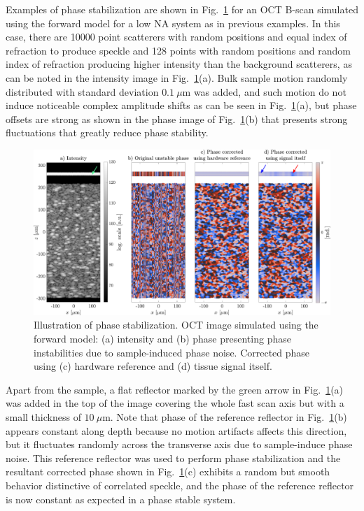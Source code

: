 Examples of phase stabilization are shown in Fig.~\ref{fig:PhaseStabilization} for an OCT B-scan simulated using the forward model for a low NA system as in previous examples. In this case, there are 10000 point scatterers with random positions and equal index of refraction to produce speckle and 128 points with random positions and random index of refraction producing higher intensity than the background scatterers, as can be noted in the intensity image in Fig.~\ref{fig:PhaseStabilization}(a). Bulk sample motion randomly distributed with standard deviation $0.1~\mu$m was added, and such motion do not induce noticeable complex amplitude shifts as can be seen in Fig.~\ref{fig:PhaseStabilization}(a), but phase offsets are strong as shown in the phase image of Fig.~\ref{fig:PhaseStabilization}(b) that presents strong fluctuations that greatly reduce phase stability.

\begin{figure}[htb!]\label{fig:PhaseStabilization}
	\centering
	\includegraphics[width=\textwidth]{Figures/TheoreticalBasis/PhaseStabilizationComp.pdf}
	\caption{Illustration of phase stabilization. OCT image simulated using the forward model: (a) intensity and (b) phase presenting phase instabilities due to sample-induced phase noise. Corrected phase using (c) hardware reference and (d) tissue signal itself.}
\end{figure}

Apart from the sample, a flat reflector marked by the green arrow in Fig.~\ref{fig:PhaseStabilization}(a) was added in the top of the image covering the whole fast scan axis but with a small thickness of $10~\mu$m. Note that phase of the reference reflector in Fig.~\ref{fig:PhaseStabilization}(b) appears constant along depth because no motion artifacts affects this direction, but it fluctuates randomly across the transverse axis due to sample-induce phase noise. This reference reflector was used to perform phase stabilization and the resultant corrected phase shown in Fig.~\ref{fig:PhaseStabilization}(c) exhibits a random but smooth behavior distinctive of correlated speckle, and the phase of the reference reflector is now constant as expected in a phase stable system.

